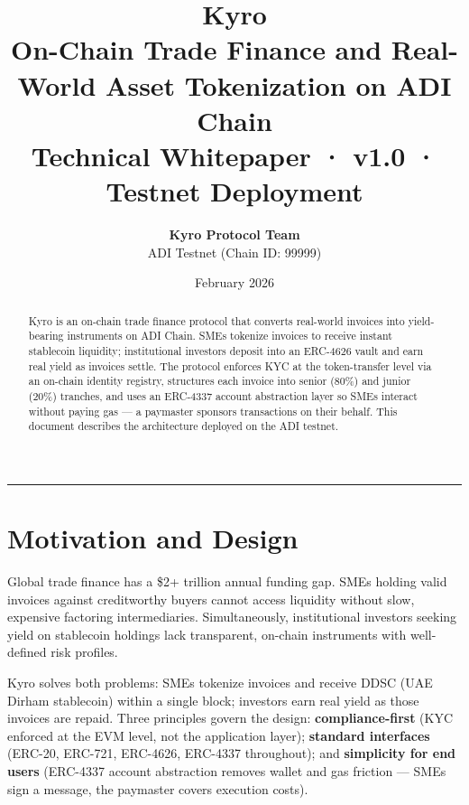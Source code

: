 \documentclass[11pt,a4paper]{article}
\title{
  {\LARGE\bfseries\color{kyroBlue} Kyro}\\[4pt]
  {\normalsize On-Chain Trade Finance and Real-World Asset Tokenization on ADI Chain}\\[6pt]
  {\small\color{kyroGray} Technical Whitepaper · v1.0 · Testnet Deployment}
}
\author{
  \textbf{Kyro Protocol Team}\\
  \small ADI Testnet (Chain ID: 99999)
}
\date{February 2026}
\begin{document}

\maketitle
\thispagestyle{fancy}

\begin{abstract}
\noindent
Kyro is an on-chain trade finance protocol that converts real-world invoices into yield-bearing
instruments on ADI Chain. SMEs tokenize invoices to receive instant stablecoin liquidity;
institutional investors deposit into an ERC-4626 vault and earn real yield as invoices settle.
The protocol enforces KYC at the token-transfer level via an on-chain identity registry,
structures each invoice into senior (80\%) and junior (20\%) tranches, and uses an
ERC-4337 account abstraction layer so SMEs interact without paying gas — a paymaster
sponsors transactions on their behalf. This document describes
the architecture deployed on the ADI testnet.
\end{abstract}

\vspace{-4pt}
\noindent\rule{\textwidth}{0.4pt}
\vspace{4pt}

\section{Motivation and Design}

Global trade finance has a \$2+ trillion annual funding gap. SMEs holding valid invoices against
creditworthy buyers cannot access liquidity without slow, expensive factoring intermediaries.
Simultaneously, institutional investors seeking yield on stablecoin holdings lack transparent,
on-chain instruments with well-defined risk profiles.

Kyro solves both problems: SMEs tokenize invoices and receive DDSC (UAE Dirham stablecoin)
within a single block; investors earn real yield as those invoices are repaid. Three principles
govern the design: \textbf{compliance-first} (KYC enforced at the EVM level, not the application
layer); \textbf{standard interfaces} (ERC-20, ERC-721, ERC-4626, ERC-4337 throughout); and
\textbf{simplicity for end users} (ERC-4337 account abstraction removes wallet and
gas friction — SMEs sign a message, the paymaster covers execution costs).
\end{document}
